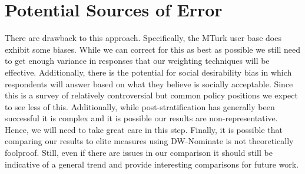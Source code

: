 \documentclass[12pt]{article}
\begin{document}
\section{Potential Sources of Error}

There are drawback to this approach. Specifically, the MTurk user base does exhibit some biases. While we can correct for this as best as possible we still need to get enough variance in responses that our weighting techniques will be effective. Additionally, there is the potential for social desirability bias in which respondents will answer based on what they believe is socially acceptable. Since this is a survey of relatively controversial but common policy positions we expect to see less of this. Additionally, while post-stratification has generally been successful it is complex and it is possible our results are non-representative. Hence, we will need to take great care in this step. Finally, it is possible that comparing our results to elite measures using DW-Nominate is not theoretically foolproof. Still, even if there are issues in our comparison it should still be indicative of a general trend and provide interesting comparisons for future work. 

\newpage




\nocite{*}
\end{document}
